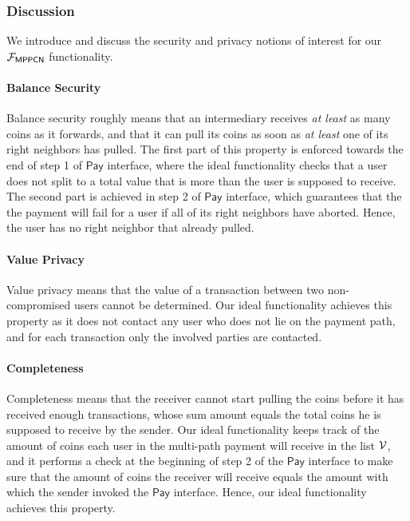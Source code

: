 \subsubsection{Discussion}
\label{sec:mppcn-discussion}

We introduce and discuss the security and privacy notions of interest for our 
$\mathcal{F}_{\mathsf{MPPCN}}$ functionality.

\paragraph{Balance Security}
Balance security roughly means that an intermediary receives \emph{at least} as many coins as 
it forwards, and that it can pull its coins as soon as \emph{at least} one of its right 
neighbors has pulled. The first part of this property is enforced towards the end of step 1 of 
$\mathsf{Pay}$ interface, where the ideal functionality checks that a user does not split to a 
total value that is more than the user is supposed to receive. The second part is achieved in 
step 2 of $\mathsf{Pay}$ interface, which guarantees that the the payment will fail for 
a user if all of its right neighbors have aborted. Hence, the user has no right neighbor 
that already pulled.

\paragraph{Value Privacy}
Value privacy means that the value of a transaction between two non-compromised users cannot 
be determined. Our ideal functionality achieves this property as it does not contact any user 
who does not lie on the payment path, and for each transaction only the involved parties are 
contacted. 


\paragraph{Completeness}
Completeness means that the receiver cannot start pulling the coins before it has received 
enough transactions, whose sum amount equals the total coins he is supposed to receive by 
the sender. Our ideal functionality keeps track of the amount of coins each user in the 
multi-path payment will receive in the list $\mathcal{V}$, and it performs a check at the beginning of 
step 2 of the $\mathsf{Pay}$ interface to make sure that the amount of coins the receiver will 
receive equals the amount with which the sender invoked the $\mathsf{Pay}$ interface. Hence, our 
ideal functionality achieves this property.

